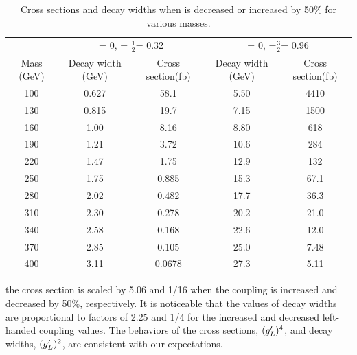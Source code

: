 \begin{table}[htb]
	\centering
	\caption{Cross sections and decay widths when \gL is decreased or increased by 50\% for various \wprime masses. \label{tab:XsecgLVar} }
	\begin{tabular}{|c|c|c|c|c|}
		\hline 
	    & \multicolumn{2}{c|}{\gR = 0, \gL = $\frac{1}{2}$\gSM = 0.32}
		& \multicolumn{2}{c|}{\gR = 0, \gL =$\frac{3}{2}$\gSM = 0.96}\\\cline{2-5}
		\wprime Mass (GeV)  &  Decay width (GeV) &  Cross section(fb)&  Decay width (GeV) &  Cross section(fb)\\
		\hline 
		100& 0.627 & 58.1  & 5.50 & 4410\\
		130& 0.815 & 19.7  & 7.15 & 1500\\
		160& 1.00  & 8.16  & 8.80 & 618\\
		190& 1.21  & 3.72  & 10.6 & 284\\
		220& 1.47  & 1.75  & 12.9 & 132\\
		250& 1.75  & 0.885 & 15.3 & 67.1\\
		280& 2.02  & 0.482 & 17.7 & 36.3\\
		310& 2.30  & 0.278 & 20.2 & 21.0\\
		340& 2.58  & 0.168 & 22.6 & 12.0\\
		370& 2.85  & 0.105 & 25.0 & 7.48\\
		400& 3.11  & 0.0678& 27.3 & 5.11\\    
		\hline
	\end{tabular}
\end{table}  
the cross section is scaled by 5.06 and 1/16 when the coupling is increased and decreased by 50\%, respectively. It is noticeable that the values of decay widths are proportional to  factors of 2.25 and  1/4 for the increased  and decreased left-handed coupling values. The behaviors of the cross sections, $(g^\prime_L)^4$, and decay widths, $(g^\prime_L)^2$, are consistent with our expectations.


